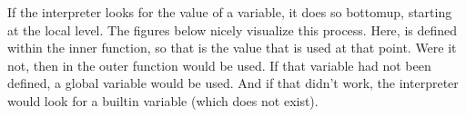 \documentclass[letterpaper,10pt,english]{jupyterBook}
\begin{document}
\sphinxAtStartPar
{}

\sphinxAtStartPar
If the interpreter looks for the value of a variable, it does so bottom\sphinxhyphen{}up, starting at the local level. The figures below nicely visualize this process. Here,  is defined within the inner function, so that is the value that is used at that point. Were it not, then  in the outer function would be used. If that variable had not been defined, a global variable  would be used. And if that didn’t work, the interpreter would look for a built\sphinxhyphen{}in variable  (which does not exist).

\sphinxAtStartPar
{}
\end{document}
